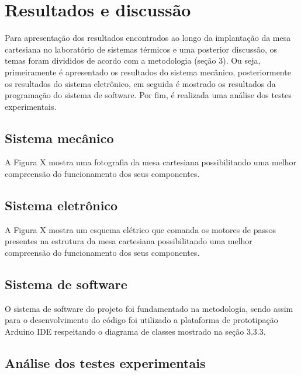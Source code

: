 \chapter{Resultados e discussão}
\label{chap:resultados}

Para apresentação dos resultados encontrados ao longo da implantação da mesa cartesiana no 
laboratório de sistemas térmicos e uma posterior discussão, os temas foram divididos de acordo 
com a metodologia (seção 3). Ou seja, primeiramente é apresentado os resultados do sistema mecânico, 
posteriormente os resultados do sistema eletrônico, em seguida é mostrado os resultados da programação 
do sistema de software. Por fim, é realizada uma análise dos testes experimentais.

\section{Sistema mecânico}

A Figura X mostra uma fotografia da mesa cartesiana possibilitando uma melhor compreensão do funcionamento 
dos seus componentes.

%
%

\section{Sistema eletrônico}

A Figura X mostra um esquema elétrico que comanda os motores de passos presentes na estrutura  da mesa 
cartesiana possibilitando uma melhor compreensão do funcionamento dos seus componentes.

%
%


\section{Sistema de software}

O sistema de software do projeto foi fundamentado na metodologia, sendo assim para o desenvolvimento do código 
foi utilizado a plataforma de prototipação Arduino IDE respeitando o diagrama de classes mostrado na seção 3.3.3.


\section{Análise dos testes experimentais}

